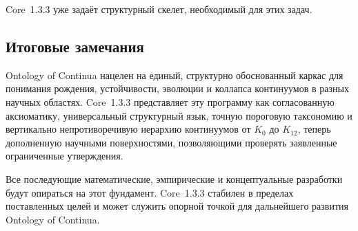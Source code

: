 Core~1.3.3 уже задаёт структурный скелет, необходимый для этих задач.

\subsection{Итоговые замечания}

Ontology of Continua нацелен на единый, структурно обоснованный
каркас для понимания рождения, устойчивости, эволюции и коллапса континуумов
в разных научных областях.
Core~1.3.3 представляет эту программу как согласованную аксиоматику, универсальный
структурный язык, точную пороговую таксономию и вертикально непротиворечивую
иерархию континуумов от \(K_0\) до \(K_{12}\), теперь дополненную научными
поверхностями, позволяющими проверять заявленные ограниченные утверждения.

Все последующие математические, эмпирические и концептуальные разработки будут
опираться на этот фундамент.
Core~1.3.3 стабилен в пределах поставленных целей и может служить опорной точкой
для дальнейшего развития Ontology of Continua.
